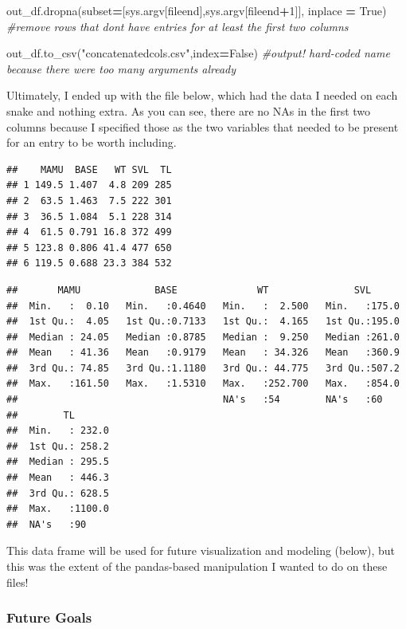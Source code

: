 \documentclass[
]{article}
\newenvironment{Shaded}{\begin{snugshade}}{\end{snugshade}}
\newcommand{\CommentTok}[1]{\textcolor[rgb]{0.56,0.35,0.01}{\textit{#1}}}
\newcommand{\DecValTok}[1]{\textcolor[rgb]{0.00,0.00,0.81}{#1}}
\newcommand{\NormalTok}[1]{#1}
\newcommand{\OperatorTok}[1]{\textcolor[rgb]{0.81,0.36,0.00}{\textbf{#1}}}
\newcommand{\StringTok}[1]{\textcolor[rgb]{0.31,0.60,0.02}{#1}}
\newcommand{\VariableTok}[1]{\textcolor[rgb]{0.00,0.00,0.00}{#1}}
\begin{document}
\begin{Shaded}
\begin{Highlighting}[]
\NormalTok{out\_df.dropna(subset}\OperatorTok{=}\NormalTok{[sys.argv[fileend],sys.argv[fileend}\OperatorTok{+}\DecValTok{1}\NormalTok{]], inplace }\OperatorTok{=} \VariableTok{True}\NormalTok{) }\CommentTok{\#remove rows that don\textquotesingle{}t have entries for at least the first two columns}

\NormalTok{out\_df.to\_csv(}\StringTok{"concatenatedcols.csv"}\NormalTok{,index}\OperatorTok{=}\VariableTok{False}\NormalTok{) }\CommentTok{\#output! hard{-}coded name because there were too many arguments already}
\end{Highlighting}
\end{Shaded}

Ultimately, I ended up with the file below, which had the data I needed
on each snake and nothing extra. As you can see, there are no NAs in the
first two columns because I specified those as the two variables that
needed to be present for an entry to be worth including.

\begin{verbatim}
##    MAMU  BASE   WT SVL  TL
## 1 149.5 1.407  4.8 209 285
## 2  63.5 1.463  7.5 222 301
## 3  36.5 1.084  5.1 228 314
## 4  61.5 0.791 16.8 372 499
## 5 123.8 0.806 41.4 477 650
## 6 119.5 0.688 23.3 384 532
\end{verbatim}

\begin{verbatim}
##       MAMU             BASE              WT               SVL       
##  Min.   :  0.10   Min.   :0.4640   Min.   :  2.500   Min.   :175.0  
##  1st Qu.:  4.05   1st Qu.:0.7133   1st Qu.:  4.165   1st Qu.:195.0  
##  Median : 24.05   Median :0.8785   Median :  9.250   Median :261.0  
##  Mean   : 41.36   Mean   :0.9179   Mean   : 34.326   Mean   :360.9  
##  3rd Qu.: 74.85   3rd Qu.:1.1180   3rd Qu.: 44.775   3rd Qu.:507.2  
##  Max.   :161.50   Max.   :1.5310   Max.   :252.700   Max.   :854.0  
##                                    NA's   :54        NA's   :60     
##        TL        
##  Min.   : 232.0  
##  1st Qu.: 258.2  
##  Median : 295.5  
##  Mean   : 446.3  
##  3rd Qu.: 628.5  
##  Max.   :1100.0  
##  NA's   :90
\end{verbatim}

This data frame will be used for future visualization and modeling
(below), but this was the extent of the pandas-based manipulation I
wanted to do on these files!

\hypertarget{future-goals}{%
\subsubsection{Future Goals}\label{future-goals}}
\end{document}
